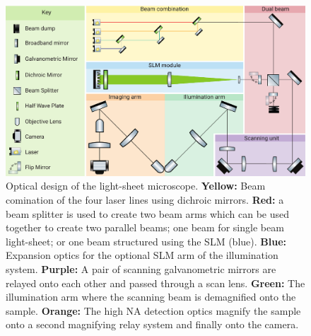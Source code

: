 \begin{landscape}
  \begin{figure}
  \centering
  \includegraphics[width=\linewidth]{./optical_design_colour}
  \caption[Full optical design of new SPIM]{
  Optical design of the light-sheet microscope. \textbf{Yellow:} Beam comination of the four laser lines using dichroic mirrors.
  \textbf{Red:} a beam splitter is used to create two beam arms which can be used together to create two parallel beams; one beam for single beam light-sheet; or one beam structured using the SLM (blue).
  \textbf{Blue:} Expansion optics for the optional SLM arm of the illumination system.
  \textbf{Purple:} A pair of scanning galvanometric mirrors are relayed onto each other and passed through a scan lens.
  \textbf{Green:} The illumination arm where the scanning beam is demagnified onto the sample.
  \textbf{Orange:} The high NA detection optics magnify the sample onto a second magnifying relay system and finally onto the camera.
  }\label{fig:optical_design_colour}
  \end{figure}
\end{landscape}

